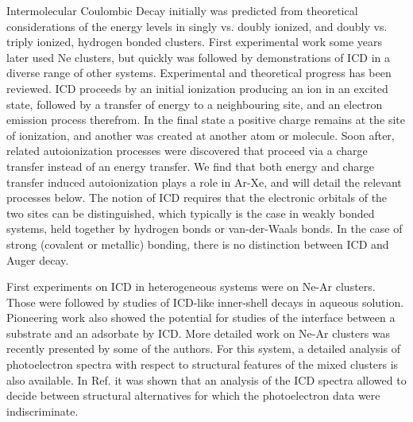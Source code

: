 Intermolecular Coulombic Decay initially was predicted from theoretical considerations of the energy levels in singly vs. doubly ionized, and doubly vs. triply ionized, hydrogen bonded clusters.\cite{cederbaum} First experimental work some years later used Ne clusters,\cite{marburger,jahnkenedimer} but quickly was followed by demonstrations of ICD in a diverse range of other systems. Experimental and theoretical progress has been reviewed.\cite{hergenhahn_review, averbukh_review, jahnke_review} ICD proceeds by an initial ionization producing an ion in an excited state, followed by a transfer of energy to a neighbouring site, and an electron emission process therefrom. In the final state a positive charge remains at the site of ionization, and another was created at another atom or molecule. Soon after, related autoionization processes were discovered that proceed via a charge transfer instead of an energy transfer. 
We find that both energy and charge transfer induced autoionization plays a role in Ar-Xe, and will detail the relevant processes below. The notion of ICD requires that the electronic orbitals of the two sites can be distinguished, which typically is the case in weakly bonded systems, held together by hydrogen bonds or van-der-Waals bonds. In the case of strong (covalent or metallic) bonding, there is no distinction between ICD and Auger decay.\cite{hergenhahn_review}

First experiments on ICD in heterogeneous systems were on Ne-Ar clusters.\cite{barthnear} Those were followed by studies of ICD-like inner-shell decays in aqueous solution.\cite{aziz,pokapanich,pokapanich2011} Pioneering work also showed the potential for studies of the interface between a substrate and an adsorbate by ICD.\cite{grieves} More detailed work on Ne-Ar clusters was recently presented by some of the authors.\cite{fasshauer2014} For this system, a detailed analysis of photoelectron spectra with respect to structural features of the mixed clusters is also available.\cite{lundwall} In Ref.  it was shown that an analysis of the ICD spectra allowed to decide between structural alternatives for which the photoelectron data were indiscriminate.


